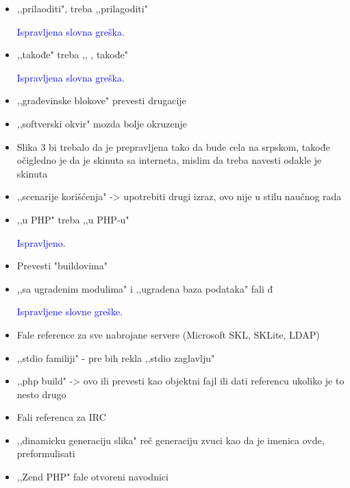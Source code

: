\documentclass[a4paper]{report}
\newcommand{\odgovor}[1]{\textcolor{blue}{#1}}
\begin{document}
\begin{itemize}
\odgovor{}

\item ,,prilaoditi", treba ,,prilagoditi" 

\odgovor{Ispravljena slovna greška.}

\item ,,takođe" treba ,, , takođe"

\odgovor{Ispravljena slovna greška.}

\item ,,građevinske blokove" prevesti drugacije

\odgovor{}

\item ,,softverski okvir"  mozda bolje okruzenje

\odgovor{}

\item Slika 3 bi trebalo da je prepravljena tako da bude cela na srpskom, takođe očigledno je da je skinuta sa interneta, mislim da treba navesti odakle je skinuta

\odgovor{}

\item ,,scenarije korišćenja" -> upotrebiti drugi izraz, ovo nije u stilu naučnog rada

\odgovor{}

\item ,,u PHP" treba ,,u PHP-u"

\odgovor{Ispravljeno.}

\item Prevesti "buildovima"

\odgovor{}

\item ,,sa ugradenim modulima" i ,,ugradena baza podataka" fali đ

\odgovor{Ispravljene slovne greške.}

\item Fale reference za sve nabrojane servere (Microsoft SKL, SKLite, LDAP)

\odgovor{}

\item ,,stdio familiji" - pre bih rekla ,,stdio zaglavlju"
\item ,,php build" -> ovo ili prevesti kao objektni fajl ili dati referencu ukoliko je to nesto drugo
\item Fali referenca za IRC
\item ,,dinamicku generaciju slika" reč generaciju zvuci kao da je imenica ovde, preformulisati

\item ,,Zend PHP" fale otvoreni navodnici


\end{itemize}
\end{document}
